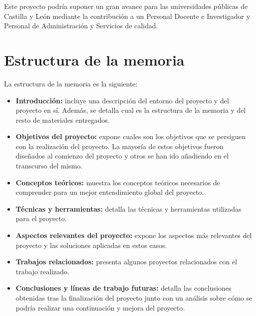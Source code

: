 Este proyecto podría suponer un gran avance para las universidades públicas de Castilla y León mediante la contribución a un Personal Docente e Investigador y Personal de Administración y Servicios de calidad.

\section{Estructura de la memoria}

La estructura de la memoria es la siguiente:

\begin{itemize}
    \item \textbf{Introducción:}  incluye una descripción del entorno del proyecto y del proyecto en sí. Además, se detalla cual es la estructura de la memoria y del resto de materiales entregados.
    \item \textbf{Objetivos del proyecto:} expone cuales son los objetivos que se persiguen con la realización del proyecto. La mayoría de estos objetivos fueron diseñados al comienzo del proyecto y otros se han ido añadiendo en el transcurso del mismo.
    \item \textbf{Conceptos teóricos:} muestra los conceptos teóricos necesarios de comprender para un mejor entendimiento global del proyecto.
    \item \textbf{Técnicas y herramientas:} detalla las técnicas y herramientas utilizadas para el proyecto.
    \item \textbf{Aspectos relevantes del proyecto:}  expone los aspectos más relevantes del proyecto y las soluciones aplicadas en estos casos.  
    \item \textbf{Trabajos relacionados:} presenta algunos proyectos relacionados con el trabajo realizado.
    \item \textbf{Conclusiones y líneas de trabajo futuras:} detalla las conclusiones obtenidas tras la finalización del proyecto junto con un análisis sobre cómo se podría realizar una continuación y mejora del proyecto.    
\end{itemize}

